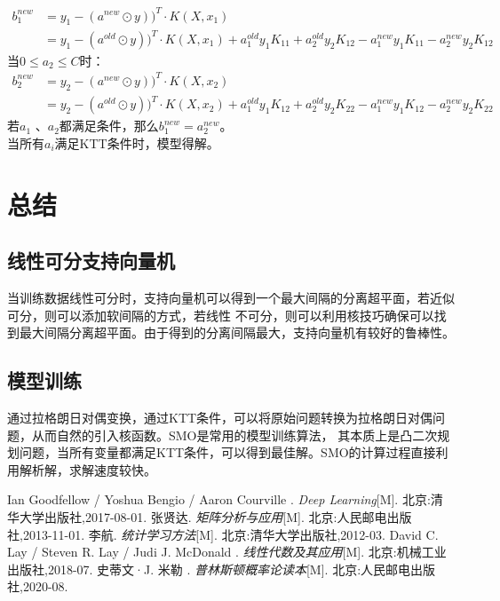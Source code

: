 \documentclass[12pt, a4paper, oneside]{ctexart}
\begin{document}
\begin{align*}
    b_1^{new} &= y_1 - (a^{new} \odot y))^T \cdot K(X, x_1) \\
    &= y_1 - (a^{old} \odot y))^T \cdot K(X, x_1) + a_1^{old}y_1K_{11} + a_2^{old}y_2K_{12} - a_1^{new}y_1K_{11} - a_2^{new}y_2K_{12} 
\end{align*}
当$0 \leq a_2 \leq C$时：
\begin{align*}
    b_2^{new} &= y_2 - (a^{new} \odot y))^T \cdot K(X, x_2) \\
    &= y_2 - (a^{old} \odot y))^T \cdot K(X, x_2) + a_1^{old}y_1K_{12} + a_2^{old}y_2K_{22} - a_1^{new}y_1K_{12} - a_2^{new}y_2K_{22}
\end{align*}
若$a_1$ 、$a_2$都满足条件，那么$b_1^{new} = a_2^{new}$。\\
当所有$a_i$满足KTT条件时，模型得解。

\section{总结}
\subsection{线性可分支持向量机}
当训练数据线性可分时，支持向量机可以得到一个最大间隔的分离超平面，若近似可分，则可以添加软间隔的方式，若线性
不可分，则可以利用核技巧确保可以找到最大间隔分离超平面。由于得到的分离间隔最大，支持向量机有较好的鲁棒性。
\subsection{模型训练}
通过拉格朗日对偶变换，通过KTT条件，可以将原始问题转换为拉格朗日对偶问题，从而自然的引入核函数。SMO是常用的模型训练算法，
其本质上是凸二次规划问题，当所有变量都满足KTT条件，可以得到最佳解。SMO的计算过程直接利用解析解，求解速度较快。


\newpage
\begin{thebibliography}{99}
    Ian Goodfellow / Yoshua Bengio / Aaron Courville . \emph{Deep Learning}[M]. 北京:清华大学出版社,2017-08-01.
    张贤达. \emph{矩阵分析与应用}[M]. 北京:人民邮电出版社,2013-11-01.
    李航. \emph{统计学习方法}[M]. 北京:清华大学出版社,2012-03.
    David C. Lay / Steven R. Lay / Judi J. McDonald . \emph{线性代数及其应用}[M]. 北京:机械工业出版社,2018-07.
    史蒂文·J. 米勒 . \emph{普林斯顿概率论读本}[M]. 北京:人民邮电出版社,2020-08.
\end{thebibliography}
\end{document}
